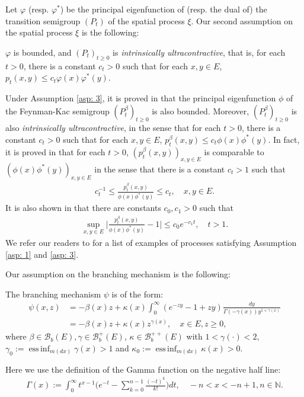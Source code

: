 	Let $\varphi$ (resp. $\varphi^*$) be the principal eigenfunction of (resp. the dual of) the transition semigroup $(P_t)$ of the spatial process $\xi$.
	Our second assumption on the spatial process $\xi$ is the following:

\begin{asp} \label{asp: 3}
	$\varphi$ is bounded, and $(P_t)_{t\geq 0}$ is \emph{intrinsically ultracontractive}, that is, for each $t>0$, there is a constant $c_t >0$ such that for each $x,y\in E$, $p_t(x,y) \leq c_t \varphi(x) \varphi^*(y)$.
\end{asp}
	
	Under Assumption \ref{asp: 3}, it is proved in \cite{RenSongZhang2015Limit, RenSongZhang2017Central} that the principal eigenfunction $\phi$ of the Feynman-Kac semigroup $(P^\beta_t)_{t\geq 0}$ is also bounded.
	Moreover, $(P^\beta_t)_{t\geq 0}$ is also \emph{intrinsically ultracontractive}, in the sense that for each $t>0$, there is a constant $c_t >0$ such that for each $x,y\in E$, $p^\beta_t(x,y) \leq c_t \phi(x) \phi^*(y)$.
	In fact, it is proved in \cite{KimSong2008Intrinsic} that for each $t>0$, $(p^\beta_t(x,y))_{x,y\in E}$ is comparable to $(\phi(x)\phi^*(y))_{x,y\in E}$ in the sense that there is a constant $c_t > 1$ such that
\begin{align}\label{eq: p-t-beta is comparable to phi phi-star}
	c_t^{-1}
	\leq \frac {p^\beta_t(x,y)} {\phi(x)\phi^*(y)}
	\leq c_t,
	\quad x,y \in E.
\end{align}
    It is also shown in \cite{KimSong2008Intrinsic} that there are constants $c_0, c_1 > 0$ such that
\begin{align}\label{eq:q(t,x,y)}
	\sup_{x,y\in E} \Big|\frac{p^\beta_t(x,y)}{\phi(x)\phi^*(y)} - 1 \Big|
	\leq c_0 e^{-c_1 t},
	\quad t > 1.
\end{align}
	We refer our readers to \cite{RenSongZhang2015Limit} for a list of examples of processes satisfying Assumption \ref{asp: 1} and \ref{asp: 3}.

	Our assumption on the branching mechanism is the following:
\begin{asp} \label{asp: 4}
	The branching mechanism $\psi$ is of the form:
\begin{align}
	\psi(x,z)
	&= - \beta(x) z + \kappa(x) \int_0^\infty (e^{-z y} - 1+ z y) \frac{dy}{\Gamma(- \gamma(x)) y^{1+ \gamma(x)}}
	\\&= -\beta (x) z + \kappa(x) z^{\gamma(x)},
	\quad x\in E, z \geq 0,
\end{align}
	where $\beta \in \mathscr B_b(E), \gamma \in \mathscr B^+_b(E)$, $\kappa \in \mathscr B^{++}_b(E)$ with $1< \gamma(\cdot )<2$, $\gamma_0 := \operatorname{ess\,inf}_{m(dx)} \gamma(x)> 1$ and $\kappa_0:=\operatorname{ess\,inf}_{m(dx)}\kappa(x) > 0$.
\end{asp}
	Here we use the definition of the Gamma function on the negative half line:
\begin{align}\label{eq: definition of Gamma function}
	\Gamma(x)
	:= \int_0^\infty t^{x-1} \Big(e^{-t} - \sum_{k=0}^{n-1} \frac{(-t)^k}{k!}\Big) dt,
	\quad -n< x< -n+1, n\in \mathbb N.
\end{align}
	

